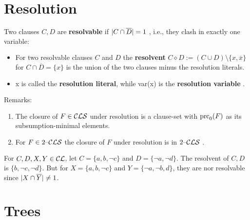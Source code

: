 \documentclass[]{book}
\begin{document}
\section{Resolution}
\label{sec:Resolution}

\begin{defi}\label{def:Resolution}
 Two clauses $C,D$ are \textbf{resolvable} if $\lvert C \cap \overline D \rvert = 1$ , i.e., they clash in exactly one variable:
\begin{itemize}
 \item For two resolvable clauses $C$ and $D$ the \textbf{resolvent} $C \diamond D := (C \cup D) \setminus \{x, \overline x\} $ for $C \cap \overline D = \{ x \}$ 
 is the union of the two clauses minus the resolution literals.
 \item x is called the \textbf{resolution literal}, while var(x) is the \textbf{resolution variable} \cite{h5}.
 \end{itemize}
 \end{defi}
 
 Remarks:
\begin{enumerate}
\item The closure of $F \in \mathcal{CLS}$ under resolution is a clause-set with $\operatorname{prc}_0(F)$ as its subsumption-minimal elements.
\item For $F \in 2\mbox{--}\mathcal{CLS}$ the closure of $F$ under resolution is in $2\mbox{--}\mathcal{CLS}$ \cite{h5}.
\end{enumerate}

\begin{examp}\label{exp:resolution1}
       For $C,D,X,Y \in \mathcal{CL}$, let $C=\{a,b, \neg c\}$ and $D=\{\neg a, \neg d\}$. The resolvent of $C,D$ is $\{b, \neg c, \neg d\}$.
	   But for $X=\{a,b, \neg c\}$ and $Y=\{\neg a, \neg b, d\}$, they are nor resolvable since $\lvert X \cap \overline Y  \rvert \not = 1$.
\end{examp}
\section{Trees}
\label{sec:Trees}
\end{document}
